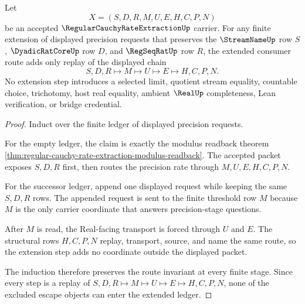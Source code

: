 \begin{theorem}
\label{thm:regular-cauchy-rate-extraction-finite-threshold-induction}
Let
$$
X=(S,D,R,M,U,E,H,C,P,N)
$$
be an accepted $\RegularCauchyRateExtractionUp$ carrier. For any finite extension of displayed precision requests that preserves the $\StreamNameUp$ row $S$, $\DyadicRatCoreUp$ row $D$, and $\RegSeqRatUp$ row $R$, the extended consumer route adds only replay of the displayed chain
$$
S,D,R \longmapsto M \longmapsto U \longmapsto E \longmapsto H,C,P,N .
$$
No extension step introduces a selected limit, quotient stream equality, countable choice, trichotomy, host real equality, ambient $\RealUp$ completeness, Lean verification, or bridge credential.
\end{theorem}
\begin{proof}
Induct over the finite ledger of displayed precision requests.

For the empty ledger, the claim is exactly the modulus readback theorem \autoref{thm:regular-cauchy-rate-extraction-modulus-readback}. The accepted packet exposes $S,D,R$ first, then routes the precision rate through $M,U,E,H,C,P,N$.

For the successor ledger, append one displayed request while keeping the same $S,D,R$ rows. The appended request is sent to the finite threshold row $M$ because $M$ is the only carrier coordinate that answers precision-stage questions.

After $M$ is read, the Real-facing transport is forced through $U$ and $E$. The structural rows $H,C,P,N$ replay, transport, source, and name the same route, so the extension step adds no coordinate outside the displayed packet.

The induction therefore preserves the route invariant at every finite stage. Since every step is a replay of $S,D,R \mapsto M \mapsto U \mapsto E \mapsto H,C,P,N$, none of the excluded escape objects can enter the extended ledger.
\end{proof}

